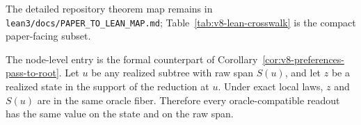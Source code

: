 The detailed repository theorem map remains in
\texttt{lean3/docs/PAPER\_TO\_LEAN\_MAP.md}; Table~\ref{tab:v8-lean-crosswalk}
is the compact paper-facing subset.

The node-level entry is the formal counterpart of
Corollary~\ref{cor:v8-preferences-pass-to-root}. Let \(u\) be any realized
subtree with raw span \(S(u)\), and let \(z\) be a realized state in the support
of the reduction at \(u\). Under exact local laws, \(z\) and \(S(u)\) are in the
same oracle fiber. Therefore every oracle-compatible readout has the same value
on the state and on the raw span.
